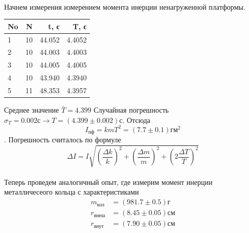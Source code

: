 \documentclass[a4paper, 12pt]{article}
\begin{document}
    \newpage
    \paragraph{}
    Начнем измерения измерением момента инерции ненагруженной платформы.

    \begin{table}[h!]
    \begin{center}
    \begin{tabular}{|l|r|r|r|}
    \hline
    No &   N &       t, с &         T, с \\
    \hline
    1  &  10 &  44.052 &  4.4052 \\
    2  &  10 &  44.003 &  4.4003 \\
    3  &  10 &  44.005 &  4.4005 \\
    4  &  10 &  43.940 &  4.3940 \\
    5  &  11 &  48.353 &  4.3957 \\
    \hline
    \end{tabular}
    \end{center}
    \end{table}
    Среднее значение $\bar T=4.399$ Случайная погрешность
    $\sigma_T = 0.002с \rightarrow T=(4.399 \pm 0.002)с$. Отсюда \[I_{пф}=kmT^2=(7.7\pm0.1)гм^2\]. Погрешность считалось по формуле
    \[\Delta I = I\sqrt{\left(\frac{\Delta k}{k}\right)^2 +
                     \left(\frac{\Delta m}{m}\right)^2 +
                     \left(2\frac{\Delta T}{T}\right)^2}\]

    \paragraph{}
    Теперь проведем аналогичный опыт, где измерим момент инерции металличесеого кольца
    с характеристиками
    \begin{align*}
    m_{кол} &= (981.7 \pm 0.5) г \\
    r_{внеш} &= (8.45 \pm 0.05) см \\
    r_{внут} &= (7.90 \pm 0.05) см
    \end{align*}
\end{document}

